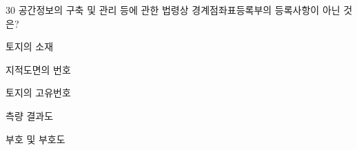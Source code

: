 \begin{question}{30}
공간정보의 구축 및 관리 등에 관한 법령상 경계점좌표등록부의 등록사항이 아닌 것은?
\begin{choices}
  \item 토지의 소재
  \item 지적도면의 번호
  \item 토지의 고유번호
  \item 측량 결과도
  \item 부호 및 부호도
\end{choices}
\end{question}
